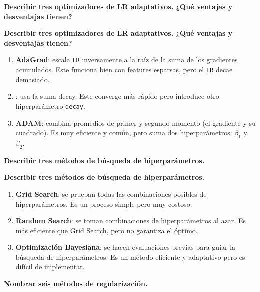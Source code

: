 \documentclass[10pt]{memoir}
\begin{document}
\clearpage
\begin{center}
	\textbf{\Large Describir tres optimizadores de LR adaptativos. ¿Qué ventajas y desventajas tienen?}
\end{center}

\clearpage
\begin{center}
	\textbf{\Large Describir tres optimizadores de LR adaptativos. ¿Qué ventajas y desventajas tienen?}
\end{center}
\begin{enumerate}
	\item \textbf{AdaGrad}: escala \texttt{LR} inversamente a la raíz de la suma de los gradientes acumulados. Este funciona bien con features esparsas, pero el \texttt{LR} decae demasiado.
	\item {}: usa la suma decay. Este converge más rápido pero introduce otro hiperparámetro \texttt{decay}.
	\item \textbf{ADAM}: combina promedios de primer y segundo momento (el gradiente y su cuadrado). Es muy eficiente y común, pero suma dos hiperparámetros: $\beta_{1}$ y $\beta_{2}$.
\end{enumerate}

\clearpage
\begin{center}
	\textbf{\Large Describir tres métodos de búsqueda de hiperparámetros.}
\end{center}

\clearpage
\begin{center}
	\textbf{\Large Describir tres métodos de búsqueda de hiperparámetros.}
\end{center}
\begin{enumerate}
	\item \textbf{Grid Search}: se prueban todas las combinaciones posibles de hiperparámetros. Es un proceso simple pero muy costoso.
	\item \textbf{Random Search}: se toman combinaciones de hiperparámetros al azar. Es más eficiente que Grid Search, pero no garantiza el óptimo.
	\item \textbf{Optimización Bayesiana}: se hacen evaluaciones previas para guiar la búsqueda de hiperparámetros. Es un método eficiente y adaptativo pero es difícil de implementar.
\end{enumerate}

\clearpage
\begin{center}
	\textbf{\Large Nombrar seis métodos de regularización.}
\end{center}
\end{document}
